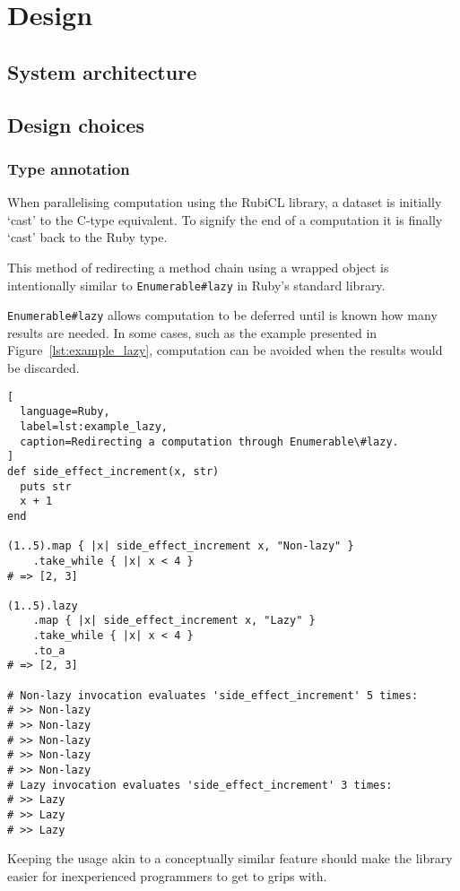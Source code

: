 \chapter{Design}

\section{System architecture}


\section{Design choices}
\subsection{Type annotation}
When parallelising computation using the RubiCL library, a dataset is initially `cast' to the C-type equivalent. To signify the end of a computation it is finally `cast' back to the Ruby type.

This method of redirecting a method chain using a wrapped object is intentionally similar to \verb|Enumerable#lazy| in Ruby's standard library.

\verb|Enumerable#lazy| allows computation to be deferred until is known how many results are needed. In some cases, such as the example presented in Figure~\ref{lst:example_lazy}, computation can be avoided when the results would be discarded.

\begin{lstlisting}[
  language=Ruby,
  label=lst:example_lazy,
  caption=Redirecting a computation through Enumerable\#lazy.
]
def side_effect_increment(x, str)
  puts str
  x + 1
end

(1..5).map { |x| side_effect_increment x, "Non-lazy" }
    .take_while { |x| x < 4 }
# => [2, 3]

(1..5).lazy
    .map { |x| side_effect_increment x, "Lazy" }
    .take_while { |x| x < 4 }
    .to_a
# => [2, 3]

# Non-lazy invocation evaluates 'side_effect_increment' 5 times:
# >> Non-lazy
# >> Non-lazy
# >> Non-lazy
# >> Non-lazy
# >> Non-lazy
# Lazy invocation evaluates 'side_effect_increment' 3 times:
# >> Lazy
# >> Lazy
# >> Lazy
\end{lstlisting}

Keeping the usage akin to a conceptually similar feature should make the library easier for inexperienced programmers to get to grips with.

